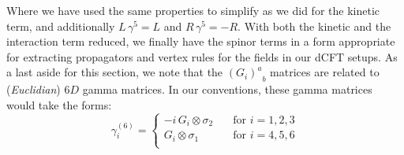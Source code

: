 %
%
Where we have used the same properties to simplify as we did for the kinetic term, and additionally $L \, \gamma^5 = L$ and $R \, \gamma^5 = -R$. With both the kinetic and the interaction term reduced, we finally have the spinor terms in a form appropriate for extracting propagators and vertex rules for the fields in our dCFT setups. As a last aside for this section, we note that the ${(G_i)^a}_b$ matrices are related to (\textit{Euclidian}) $6D$ gamma matrices. In our conventions, these gamma matrices would take the forms:
%
%
\begin{equation}
\gamma^{(6)}_i
=
\begin{cases}
	-i \, G_i \otimes \sigma_2
	& \quad \text{for } i = 1,2,3 \\
		
    G_i \otimes \sigma_1
    & \quad \text{for } i = 4,5,6 \\
\end{cases}
\end{equation}
%
%

